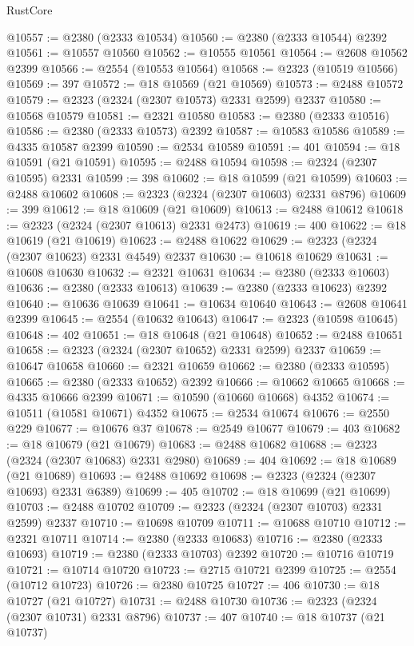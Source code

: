 \begin{lexlean}{RustCore}
\begin{coremodule}
@10557 := @2380 (@2333 @10534)
@10560 := @2380 (@2333 @10544) @2392
@10561 := @10557 @10560
@10562 := @10555 @10561
@10564 := @2608 @10562 @2399
@10566 := @2554 (@10553 @10564)
@10568 := @2323 (@10519 @10566)
@10569 := 397
@10572 := @18 @10569 (@21 @10569)
@10573 := @2488 @10572
@10579 := @2323 (@2324 (@2307 @10573) @2331 @2599) @2337
@10580 := @10568 @10579
@10581 := @2321 @10580
@10583 := @2380 (@2333 @10516)
@10586 := @2380 (@2333 @10573) @2392
@10587 := @10583 @10586
@10589 := @4335 @10587 @2399
@10590 := @2534 @10589
@10591 := 401
@10594 := @18 @10591 (@21 @10591)
@10595 := @2488 @10594
@10598 := @2324 (@2307 @10595) @2331
@10599 := 398
@10602 := @18 @10599 (@21 @10599)
@10603 := @2488 @10602
@10608 := @2323 (@2324 (@2307 @10603) @2331 @8796)
@10609 := 399
@10612 := @18 @10609 (@21 @10609)
@10613 := @2488 @10612
@10618 := @2323 (@2324 (@2307 @10613) @2331 @2473)
@10619 := 400
@10622 := @18 @10619 (@21 @10619)
@10623 := @2488 @10622
@10629 := @2323 (@2324 (@2307 @10623) @2331 @4549) @2337
@10630 := @10618 @10629
@10631 := @10608 @10630
@10632 := @2321 @10631
@10634 := @2380 (@2333 @10603)
@10636 := @2380 (@2333 @10613)
@10639 := @2380 (@2333 @10623) @2392
@10640 := @10636 @10639
@10641 := @10634 @10640
@10643 := @2608 @10641 @2399
@10645 := @2554 (@10632 @10643)
@10647 := @2323 (@10598 @10645)
@10648 := 402
@10651 := @18 @10648 (@21 @10648)
@10652 := @2488 @10651
@10658 := @2323 (@2324 (@2307 @10652) @2331 @2599) @2337
@10659 := @10647 @10658
@10660 := @2321 @10659
@10662 := @2380 (@2333 @10595)
@10665 := @2380 (@2333 @10652) @2392
@10666 := @10662 @10665
@10668 := @4335 @10666 @2399
@10671 := @10590 (@10660 @10668) @4352
@10674 := @10511 (@10581 @10671) @4352
@10675 := @2534 @10674
@10676 := @2550 @229
@10677 := @10676 @37
@10678 := @2549 @10677
@10679 := 403
@10682 := @18 @10679 (@21 @10679)
@10683 := @2488 @10682
@10688 := @2323 (@2324 (@2307 @10683) @2331 @2980)
@10689 := 404
@10692 := @18 @10689 (@21 @10689)
@10693 := @2488 @10692
@10698 := @2323 (@2324 (@2307 @10693) @2331 @6389)
@10699 := 405
@10702 := @18 @10699 (@21 @10699)
@10703 := @2488 @10702
@10709 := @2323 (@2324 (@2307 @10703) @2331 @2599) @2337
@10710 := @10698 @10709
@10711 := @10688 @10710
@10712 := @2321 @10711
@10714 := @2380 (@2333 @10683)
@10716 := @2380 (@2333 @10693)
@10719 := @2380 (@2333 @10703) @2392
@10720 := @10716 @10719
@10721 := @10714 @10720
@10723 := @2715 @10721 @2399
@10725 := @2554 (@10712 @10723)
@10726 := @2380 @10725
@10727 := 406
@10730 := @18 @10727 (@21 @10727)
@10731 := @2488 @10730
@10736 := @2323 (@2324 (@2307 @10731) @2331 @8796)
@10737 := 407
@10740 := @18 @10737 (@21 @10737)

\end{coremodule}
\end{lexlean}
